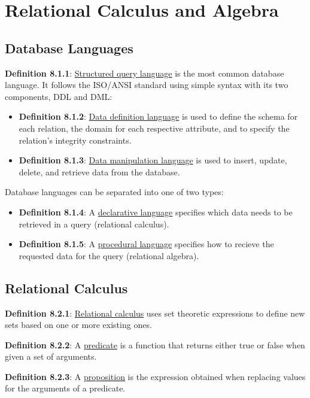 \documentclass{article}
\newcommand{\separate}[1] {\vspace{#1 pt}\noindent}
\newcommand{\definition}[2]{\textbf{Definition #1}: #2\label{def:#1}}
\begin{document}
\section{Relational Calculus and Algebra}

\subsection{Database Languages}

\definition{8.1.1}{\underline{Structured query language} is the most common database language. It follows the ISO/ANSI standard using simple syntax with its two components, DDL and DML:}
\begin{itemize}
    \item \definition{8.1.2}{\underline{Data definition language} is used to define the schema for each relation, the domain for each respective attribute, and to specify the relation's integrity constraints.}
    \item \definition{8.1.3}{\underline{Data manipulation language} is used to insert, update, delete, and retrieve data from the database.}
\end{itemize}

\separate{7}Database languages can be separated into one of two types:
\begin{itemize}
    \item \definition{8.1.4}{A \underline{declarative language} specifies which data needs to be retrieved in a query (relational calculus).}
    \item \definition{8.1.5}{A \underline{procedural language} specifies how to recieve the requested data for the query (relational algebra).}
\end{itemize}

\newpage\subsection{Relational Calculus}

\definition{8.2.1}{\underline{Relational calculus} uses set theoretic expressions to define new sets based on one or more existing ones.}

\separate{7}\definition{8.2.2}{A \underline{predicate} is a function that returns either true or false when given a set of arguments.}

\separate{7}\definition{8.2.3}{A \underline{proposition} is the expression obtained when replacing values for the arguments of a predicate.}
\end{document}
